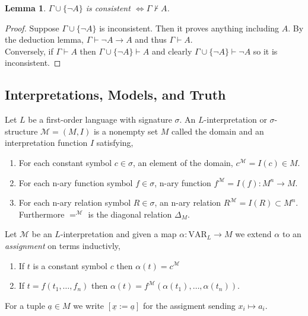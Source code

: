 \documentclass[12pt]{article}
\newcommand{\proves}{\vdash}
\newcommand{\Mmod}{\mathcal{M}}
\newcommand{\ul}[1]{\underline{#1}}
\newcommand{\VAR}[1]{\mathrm{VAR}_{#1}}
\newenvironment{definition}[1][Definition:]{\begin{trivlist}
\item[\hskip \labelsep {\bfseries #1}]}{\end{trivlist}}
\theoremstyle{theorem}
\newtheorem{lemma}[theorem]{Lemma}
\theoremstyle{definition}
\theoremstyle{definition}
\theoremstyle{remark}
\theoremstyle{definition}
\theoremstyle{remark}
\begin{document}
\begin{lemma}
$\Gamma \cup \{ \neg A \}$ is consistent $\iff \Gamma \not\proves A$.
\end{lemma}

\begin{proof}
Suppose $\Gamma \cup \{ \neg A \}$ is inconsistent. Then it proves anything including $A$. By the deduction lemma, $\Gamma \proves \neg A \to A$ and thus $\Gamma \proves A$.
\bigskip\\
Conversely,
if $\Gamma \proves A$ then $\Gamma \cup \{ \neg A \} \proves A$ and clearly $\Gamma \cup \{ \neg A \} \proves \neg A$ so it is inconsistent. 
\end{proof}

\subsection{Interpretations, Models, and Truth}

\begin{definition}
Let $L$ be a first-order language with signature $\sigma$. An $L$-interpretation or $\sigma$-structure $\Mmod = (M, I)$ is a nonempty set $M$ called the domain and an interpretation function $I$ satisfying,
\begin{enumerate}
\item For each constant symbol $c \in \sigma$, an element of the domain, $c^{\Mmod} = I(c) \in M$.
\item For each n-ary function symbol $f \in \sigma$, n-ary function $f^{\Mmod} = I(f) : M^n \to M$.
\item For each n-ary relation symbol $R \in \sigma$, an n-ary relation $R^{\Mmod} = I(R) \subset M^n$. Furthermore $=^{\Mmod}$ is the diagonal relation $\Delta_M$.
\end{enumerate}
\end{definition}

\begin{definition}
Let $\Mmod$ be an $L$-interpretation and given a map $\alpha : \VAR{L} \to M$ we extend $\alpha$ to an \textit{assignment} on terms inductivly,
\begin{enumerate}
\item If $t$ is a constant symbol $c$ then $\alpha(t) = c^{\Mmod}$
\item If $t = f(t_1, \dots, f_n)$ then $\alpha(t) = f^{\Mmod}(\alpha(t_1), \dots, \alpha(t_n))$.  
\end{enumerate} 
For a tuple $\ul{a} \in M$ we write $[\ul{x} := \ul{a}]$ for the assigment sending $x_i \mapsto a_i$.
\end{definition}
\end{document}
